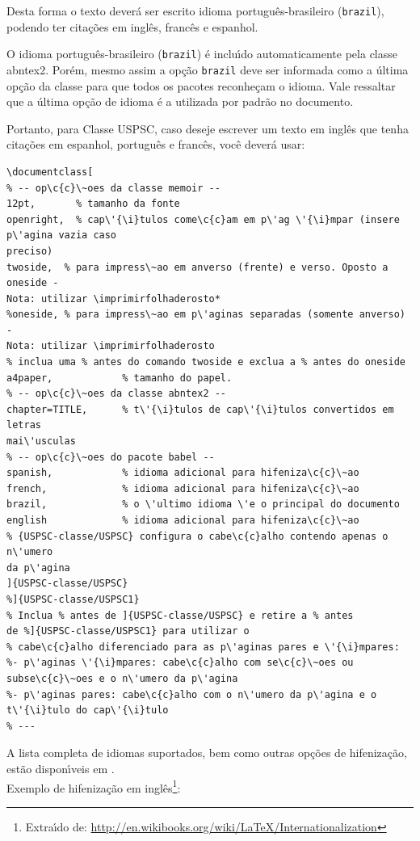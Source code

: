 Desta forma o texto dever\'a ser escrito idioma portugu\^es-brasileiro (\texttt{brazil}), podendo ter cita\c{c}\~oes em ingl\^es, franc\^es e espanhol.

O idioma portugu\^es-brasileiro (\texttt{brazil}) \'e inclu\'{\i}do automaticamente pela
classe \textsf{abntex2}. Por\'em, mesmo assim a op\c{c}\~ao \texttt{brazil} deve ser
informada como a \'ultima op\c{c}\~ao da classe para que todos os pacotes reconhe\c{c}am o
idioma. Vale ressaltar que a \'ultima op\c{c}\~ao de idioma \'e a utilizada por padr\~ao no
documento. 

Portanto, para Classe USPSC, caso deseje escrever um texto em ingl\^es que tenha
cita\c{c}\~oes em espanhol, portugu\^es e franc\^es, voc\^e dever\'a usar:

\begin{verbatim}
\documentclass[
% -- op\c{c}\~oes da classe memoir --
12pt,		% tamanho da fonte
openright,	% cap\'{\i}tulos come\c{c}am em p\'ag \'{\i}mpar (insere p\'agina vazia caso 
preciso)
twoside,  % para impress\~ao em anverso (frente) e verso. Oposto a oneside - 
Nota: utilizar \imprimirfolhaderosto*
%oneside, % para impress\~ao em p\'aginas separadas (somente anverso) -  
Nota: utilizar \imprimirfolhaderosto
% inclua uma % antes do comando twoside e exclua a % antes do oneside 
a4paper,			% tamanho do papel. 
% -- op\c{c}\~oes da classe abntex2 --
chapter=TITLE,		% t\'{\i}tulos de cap\'{\i}tulos convertidos em letras 
mai\'usculas
% -- op\c{c}\~oes do pacote babel --
spanish,			% idioma adicional para hifeniza\c{c}\~ao
french,				% idioma adicional para hifeniza\c{c}\~ao
brazil,				% o \'ultimo idioma \'e o principal do documento
english 			% idioma adicional para hifeniza\c{c}\~ao
% {USPSC-classe/USPSC} configura o cabe\c{c}alho contendo apenas o n\'umero 
da p\'agina
]{USPSC-classe/USPSC}
%]{USPSC-classe/USPSC1}
% Inclua % antes de ]{USPSC-classe/USPSC} e retire a % antes 
de %]{USPSC-classe/USPSC1} para utilizar o 
% cabe\c{c}alho diferenciado para as p\'aginas pares e \'{\i}mpares:
%- p\'aginas \'{\i}mpares: cabe\c{c}alho com se\c{c}\~oes ou subse\c{c}\~oes e o n\'umero da p\'agina
%- p\'aginas pares: cabe\c{c}alho com o n\'umero da p\'agina e o t\'{\i}tulo do cap\'{\i}tulo 
% ---
\end{verbatim}

A lista completa de idiomas suportados, bem como outras op\c{c}\~oes de hifeniza\c{c}\~ao,
est\~ao dispon\'{\i}veis em . \\

Exemplo de hifeniza\c{c}\~ao em ingl\^es\footnote{Extra\'{\i}do de:
	\url{http://en.wikibooks.org/wiki/LaTeX/Internationalization}}:

